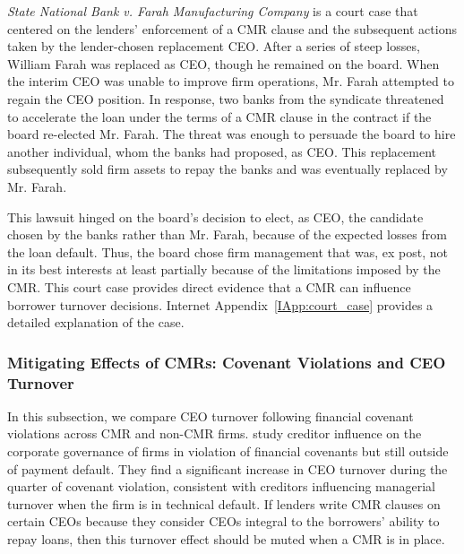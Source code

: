 \documentclass[a4paper,12pt]{article}
\begin{document}
\textit{State National Bank v. Farah Manufacturing Company} is a court case that centered on the lenders' enforcement of a CMR clause and the subsequent actions taken by the lender-chosen replacement CEO.
After a series of steep losses, William Farah was replaced as CEO, though he remained on the board.
When the interim CEO was unable to improve firm operations, Mr. Farah attempted to regain the CEO position.
In response, two banks from the syndicate threatened to accelerate the loan under the terms of a CMR clause in the contract if the board re-elected Mr. Farah.
The threat was enough to persuade the board to hire another individual, whom the banks had proposed, as CEO.
This replacement subsequently sold firm assets to repay the banks and was eventually replaced by Mr. Farah.


This lawsuit hinged on the board's decision to elect, as CEO, the candidate chosen by the banks rather than Mr. Farah, because of the expected losses from the loan default.
Thus, the board chose firm management that was, ex post, not in its best interests at least partially because of the limitations imposed by the CMR.
This court case provides direct evidence that a CMR can influence borrower turnover decisions.
Internet Appendix~\ref{IApp:court_case} provides a detailed explanation of the case.


\subsubsection{Mitigating Effects of CMRs: Covenant Violations and CEO Turnover}

In this subsection, we compare CEO turnover following financial covenant violations across CMR and non-CMR firms.
\cite{Nini_2012} study creditor influence on the corporate governance of firms in violation of financial covenants but still outside of payment default.
They find a significant increase in CEO turnover during the quarter of covenant violation, consistent with creditors influencing managerial turnover when the firm is in technical default.
If lenders write CMR clauses on certain CEOs because they consider CEOs integral to the borrowers’ ability to repay loans, then this turnover effect should be muted when a CMR is in place. 
\end{document}
